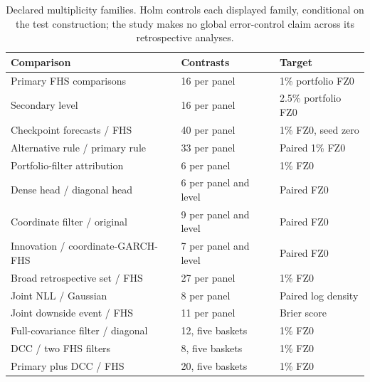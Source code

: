 \documentclass[11pt]{article}
\theoremstyle{definition}\newtheorem{definition}[theorem]{Definition}
\theoremstyle{remark}\newtheorem{remark}[theorem]{Remark}
\begin{document}
\begin{table}[htbp]
\centering\footnotesize
\setlength{\tabcolsep}{4pt}
\begin{tabular}{lll}
\toprule
Comparison & Contrasts & Target \\
\midrule
Primary FHS comparisons & 16 per panel & 1\% portfolio FZ0 \\
Secondary level & 16 per panel & 2.5\% portfolio FZ0 \\
Checkpoint forecasts / FHS & 40 per panel & 1\% FZ0, seed zero \\
Alternative rule / primary rule & 33 per panel & Paired 1\% FZ0 \\
Portfolio-filter attribution & 6 per panel & 1\% FZ0 \\
Dense head / diagonal head & 6 per panel and level & Paired FZ0 \\
Coordinate filter / original & 9 per panel and level & Paired FZ0 \\
Innovation / coordinate-GARCH-FHS & 7 per panel and level & Paired FZ0 \\
Broad retrospective set / FHS & 27 per panel & 1\% FZ0 \\
Joint NLL / Gaussian & 8 per panel & Paired log density \\
Joint downside event / FHS & 11 per panel & Brier score \\
Full-covariance filter / diagonal & 12, five baskets & 1\% FZ0 \\
DCC / two FHS filters & 8, five baskets & 1\% FZ0 \\
Primary plus DCC / FHS & 20, five baskets & 1\% FZ0 \\
\bottomrule
\end{tabular}
\caption{Declared multiplicity families. Holm controls each displayed family, conditional on the test construction; the study makes no global error-control claim across its retrospective analyses.}\label{tab:r4-families}
\end{table}

\FloatBarrier
\end{document}
